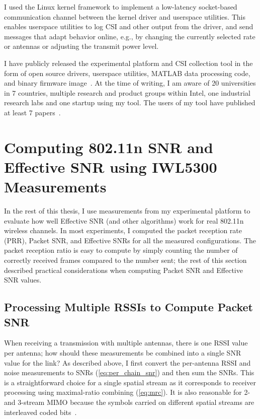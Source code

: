  I used the Linux kernel  framework to implement a low-latency socket-based communication channel between the kernel driver and userspace utilities. This enables userspace utilities to log CSI and other output from the driver, and send messages that adapt behavior online, e.g., by changing the currently selected rate or antennas or adjusting the transmit power level.

 I have publicly released the experimental platform and CSI collection tool in the form of open source drivers, userspace utilities, MATLAB data processing code, and binary firmware image~\cite{Halperin_csitool}. At the time of writing, I am aware of 20 universities in 7 countries, multiple research and product groups within Intel, one industrial research labs and one startup using my tool. The users of my tool have published at least 7 papers~\cite{Bhartia_FreqDiv,Crepaldi_CSI_SF,Gong_MuMIMO,Perahia_Doppler,Sen_SpinLoc,Sen_PinLoc,Wu_FILA}.

\section{Computing 802.11n SNR and Effective SNR using IWL5300 Measurements}
In the rest of this thesis, I use measurements from my experimental platform to evaluate how well Effective SNR (and other algorithms) work for real 802.11n wireless channels. In most experiments, I computed the packet reception rate (PRR), Packet SNR, and Effective SNRs for all the measured configurations. The packet reception ratio is easy to compute by simply counting the number of correctly received frames compared to the number sent; the rest of this section described practical considerations when computing Packet SNR and Effective SNR values.

\subsection{Processing Multiple RSSIs to Compute Packet SNR}
When receiving a transmission with multiple antennas, there is one RSSI value per antenna; how should these measurements be combined into a single SNR value for the link? As described above, I first convert the per-antenna RSSI and noise measurements to SNRs (\eqref{eq:per_chain_snr}) and then sum the SNRs. This is a straightforward choice for a single spatial stream as it corresponds to receiver processing using maximal-ratio combining (\eqref{eq:mrc}). It is also reasonable for 2- and 3-stream MIMO because the symbols carried on different spatial streams are interleaved coded bits~\cite{80211n}.

